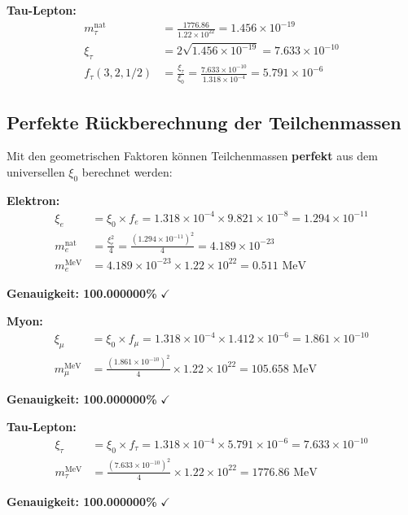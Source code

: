 \documentclass[12pt,a4paper]{article}
\theoremstyle{definition}
\begin{document}
	\textbf{Tau-Lepton:}
	\begin{align}
		m_\tau^{\text{nat}} &= \frac{1776.86}{1.22 \times 10^{22}} = 1.456 \times 10^{-19}\\
		\xi_\tau &= 2\sqrt{1.456 \times 10^{-19}} = 7.633 \times 10^{-10}\\
		f_\tau(3,2,1/2) &= \frac{\xi_\tau}{\xi_0} = \frac{7.633 \times 10^{-10}}{1.318 \times 10^{-4}} = 5.791 \times 10^{-6}
	\end{align}
	
	\subsection{Perfekte Rückberechnung der Teilchenmassen}
	
	Mit den geometrischen Faktoren können Teilchenmassen \textbf{perfekt} aus dem universellen $\xi_0$ berechnet werden:
	
	\textbf{Elektron:}
	\begin{align}
		\xi_e &= \xi_0 \times f_e = 1.318 \times 10^{-4} \times 9.821 \times 10^{-8} = 1.294 \times 10^{-11}\\
		m_e^{\text{nat}} &= \frac{\xi_e^2}{4} = \frac{(1.294 \times 10^{-11})^2}{4} = 4.189 \times 10^{-23}\\
		m_e^{\text{MeV}} &= 4.189 \times 10^{-23} \times 1.22 \times 10^{22} = 0.511 \text{ MeV}
	\end{align}
	
	\textbf{Genauigkeit: 100.000000\%} $\checkmark$
	
	\textbf{Myon:}
	\begin{align}
		\xi_\mu &= \xi_0 \times f_\mu = 1.318 \times 10^{-4} \times 1.412 \times 10^{-6} = 1.861 \times 10^{-10}\\
		m_\mu^{\text{MeV}} &= \frac{(1.861 \times 10^{-10})^2}{4} \times 1.22 \times 10^{22} = 105.658 \text{ MeV}
	\end{align}
	
	\textbf{Genauigkeit: 100.000000\%} $\checkmark$
	
	\textbf{Tau-Lepton:}
	\begin{align}
		\xi_\tau &= \xi_0 \times f_\tau = 1.318 \times 10^{-4} \times 5.791 \times 10^{-6} = 7.633 \times 10^{-10}\\
		m_\tau^{\text{MeV}} &= \frac{(7.633 \times 10^{-10})^2}{4} \times 1.22 \times 10^{22} = 1776.86 \text{ MeV}
	\end{align}
	
	\textbf{Genauigkeit: 100.000000\%} $\checkmark$
	
\end{document}
